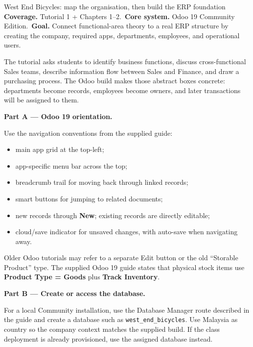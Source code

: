 
\begin{labproject}{West End Bicycles: map the organisation, then build the ERP foundation}
\textbf{Coverage.} Tutorial 1 + Chapters 1--2.\
\textbf{Core system.} Odoo 19 Community Edition.\
\textbf{Goal.} Connect functional-area theory to a real ERP structure by creating the company, required apps, departments, employees, and operational users.

\begin{labmode}
The tutorial asks students to identify business functions, discuss cross-functional Sales teams, describe information flow between Sales and Finance, and draw a purchasing process. The Odoo build makes those abstract boxes concrete: departments become records, employees become owners, and later transactions will be assigned to them.
\end{labmode}

\medskip\noindent\textbf{Part A --- Odoo 19 orientation.}

Use the navigation conventions from the supplied guide:
\begin{itemize}
  \item main app grid at the top-left;
  \item app-specific menu bar across the top;
  \item breadcrumb trail for moving back through linked records;
  \item smart buttons for jumping to related documents;
  \item new records through \textbf{New}; existing records are directly editable;
  \item cloud/save indicator for unsaved changes, with auto-save when navigating away.
\end{itemize}

\begin{pitfall}
Older Odoo tutorials may refer to a separate Edit button or the old ``Storable Product'' type. The supplied Odoo 19 guide states that physical stock items use \textbf{Product Type = Goods} plus \textbf{Track Inventory}.
\end{pitfall}

\medskip\noindent\textbf{Part B --- Create or access the database.}

For a local Community installation, use the Database Manager route described in the guide and create a database such as \texttt{west\_end\_bicycles}. Use Malaysia as country so the company context matches the supplied build. If the class deployment is already provisioned, use the assigned database instead.


\end{labproject}
